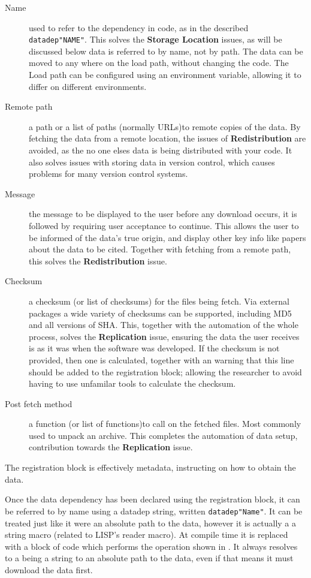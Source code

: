 \documentclass[twoside,11pt]{article}
\newcommand{\datadep}[1]{\texttt{datadep"{}#1"{}}}
\begin{document}
\begin{description}
	\item[Name] used to refer to the dependency in code, as in the described \datadep{NAME}. 
	This solves the \textbf{Storage Location} issues, as will be discussed below data is referred to by name, not by path. The data can be moved to any where on the load path, without changing the code. The Load path can be configured using an environment variable, allowing it to differ on different environments.
	\item[Remote path] a path or a list of paths (normally URLs)to remote copies of the data. By fetching the data from a remote location, the issues of \textbf{Redistribution} are avoided, as the no one elses data is being distributed with your code. It also solves issues with storing data in version control, which causes problems for many version control systems.
	\item[Message] the message to be displayed to the user before any download occurs, it is followed by requiring user acceptance to continue. This allows the user to be informed of the data's true origin, and display other key info like papers about the data to be cited. Together with fetching from a remote path, this solves the \textbf{Redistribution} issue.
	\item[Checksum] a checksum (or list of checksums) for the files being fetch. Via external packages a wide variety of checksums can be supported, including MD5 and all versions of SHA.
	This, together with the automation of the whole process, solves the \textbf{Replication} issue, 
	ensuring the data the user receives is as it was when the software was developed.
	If the checksum is not provided, then one is calculated, together with an warning that this line should be added to the registration block; allowing the researcher to avoid having to use unfamilar tools to calculate the checksum.
	\item[Post fetch method] a function  (or list of functions)to call on the fetched files. Most commonly used to unpack an archive. This completes the automation of data setup, contribution towards the \textbf{Replication} issue.
\end{description}
\noindent The registration block is effectively metadata, instructing on how to obtain the data.

Once the data dependency has been declared using the registration block, it can be referred to by name using a datadep string, written \datadep{Name}.
It can be treated just like it were an absolute path to the data, however it is actually a a string macro (related to LISP's reader macro).
At compile time it is replaced with a block of code which performs the operation shown in .
It always resolves to a being a string to an absolute path to the data, even if that means it must download the data first.
\end{document}

